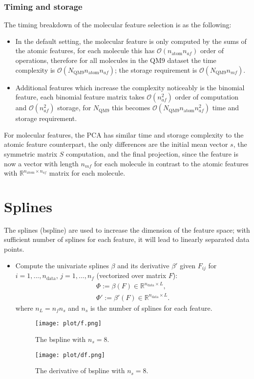 \documentclass[12pt]{article}
\begin{document}
\subsubsection{Timing and storage}
The timing breakdown of the molecular feature selection is as the following:
\begin{itemize}
	\item In the default setting, the molecular feature is only computed by the sums of the atomic features, for each molecule this has $\mathcal{O}(n_\text{atom} n_{af})$ order of operations, therefore for all molecules in the QM9 dataset the time complexity is $\mathcal{O}(N_\text{QM9}n_\text{atom} n_{af})$; the storage requirement is $\mathcal{O}(N_\text{QM9}n_{mf})$. 
	\item Additional features which increase the complexity noticeably is the binomial feature, each binomial feature matrix takes $\mathcal{O}(n^2_{af})$ order of computation and $\mathcal{O}(n^2_{af})$ storage, for $N_\text{QM9}$ this becomes $\mathcal{O}(N_\text{QM9}n_\text{atom}n^2_{af})$ time and storage requirement.
\end{itemize}
For molecular features, the PCA has similar time and storage complexity to the atomic feature counterpart, the only differences are the initial mean vector $s$, the symmetric matrix $S$ computation, and the final projection, since the feature is now a vector with length $n_{mf}$ for each molecule in contrast to the atomic features with $\mathbb{R}^{n_\text{atom} \times n_{af}}$ matrix for each molecule.


\section{Splines}
The splines (bspline) are used to increase the dimension of the feature space; with sufficient number of splines for each feature, it will lead to linearly separated data points.
\begin{itemize}
	\item Compute the univariate splines $\beta$ and its derivative $\beta'$ given $F_{ij}$ for $i = 1,...,n_\text{data}$, $j = 1,...,n_f$ (vectorized over matrix $F$):
	\begin{equation}
		\label{eq:spline}
		\begin{split}
			\Phi := \beta(F) \in \mathbb{R}^{n_\text{data} \times L}, \\
			\Phi' := \beta'(F) \in \mathbb{R}^{n_\text{data} \times L}.
		\end{split}
	\end{equation}
	where $n_L = n_fn_s$ and $n_s$ is the number of splines for each feature.
	\begin{figure}[h]
		\label{fig:spline}
		\centering
		\texttt{[image: plot/f.png]}
		\caption{The bspline with $n_s = 8$.}
	\end{figure}
	\begin{figure}[H]
		\label{fig:dspline}
		\centering
		\texttt{[image: plot/df.png]}
		\caption{The derivative of bspline with $n_s = 8$.}
	\end{figure}
\end{itemize}
\end{document}
